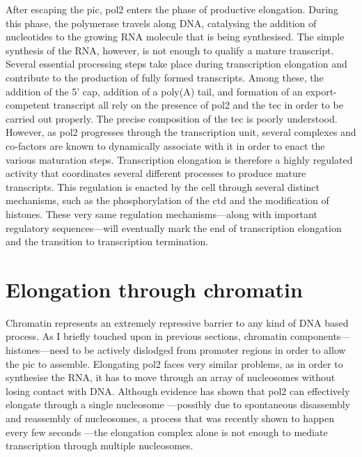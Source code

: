 After escaping the \gls{pic}, \gls{pol2} enters the phase of productive elongation.
During this phase, the polymerase travels along DNA, catalysing the addition of nucleotides to the growing RNA molecule that is being synthesised.
The simple synthesis of the RNA, however, is not enough to qualify a mature transcript.
Several essential processing steps take place during transcription elongation and contribute to the production of fully formed transcripts.
Among these, the addition of the 5' cap, addition of a poly(A) tail, and formation of an export-competent transcript all rely on the presence of \gls{pol2} and the \gls{tec} in order to be carried out properly.
The precise composition of the \gls{tec} is poorly understood. 
However, as \gls{pol2} progresses through the transcription unit, several complexes and co-factors are known to dynamically associate with it in order to enact the various maturation steps.  
Transcription elongation is therefore a highly regulated activity that coordinates several different processes to produce mature transcripts.
This regulation is enacted by the cell through several distinct mechanisms, such as the phosphorylation of the \gls{ctd} and the modification of histones.
These very same regulation mechanisms---along with important regulatory sequences---will eventually mark the end of transcription elongation and the transition to transcription termination.

\section{Elongation through chromatin}
Chromatin represents an extremely repressive barrier to any kind of DNA based process.
As I briefly touched upon in previous sections, chromatin components---histones---need to be actively dislodged from promoter regions in order to allow the \acrlong{pic} to assemble.
Elongating \gls{pol2} faces very similar problems, as in order to synthesise the RNA, it has to move through an array of nucleosomes without losing contact with DNA.
Although \invitro{} evidence has shown that \gls{pol2} can effectively elongate through a single nucleosome 
\citep{lorch:1987:nucleosomes}---possibly due to spontaneous disassembly and reassembly of nucleosomes, a process that was recently shown to happen every few seconds \citep{kim:2016:singlemolecule}---the elongation complex alone is not enough to mediate transcription through multiple nucleosomes.

